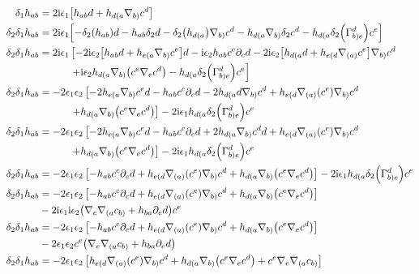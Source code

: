 \begin{align*}
    \delta_1h_{ab}&=2\im\epsilon_1\qty[h_{ab}d+h_{d(a}\nabla_{b)}c^d]\\
    \delta_2\delta_1h_{ab}&=2\im\epsilon_1\qty[-\delta_2\qty(h_{ab})d-h_{ab}\delta_2d-\delta_2\qty(h_{d(a})\nabla_{b)}c^d-h_{d(a}\nabla_{b)}\delta_2 c^d-h_{d(a}\delta_2\qty(\Gamma^d_{b)e})c^e]\\
    \delta_2\delta_1h_{ab}&=2\im\epsilon_1\left[-2\im\epsilon_2\qty[h_{ab}d+h_{e(a}\nabla_{b)}c^e]d-\im\epsilon_2h_{ab}c^c\partial_cd-2\im\epsilon_2\qty[h_{d(a}d+h_{e(d}\nabla_{(a)}c^e]\nabla_{b)}c^d\right.\\
    &\quad\quad\quad\left.+\im\epsilon_2h_{d(a}\nabla_{b)}\qty(c^e\nabla_ec^d)-h_{d(a}\delta_2\qty(\Gamma^d_{b)e})c^e\right]\\
    \delta_2\delta_1h_{ab}&=-2\epsilon_1\epsilon_2\left[-2h_{e(a}\nabla_{b)}c^ed-h_{ab}c^c\partial_cd-2h_{d(a}d\nabla_{b)}c^d+h_{e(d}\nabla_{(a)}\qty(c^e)\nabla_{b)}c^d\right.\\
    &\quad\quad\quad\left.+h_{d(a}\nabla_{b)}\qty(c^e\nabla_ec^d)\right]-2\im\epsilon_1h_{d(a}\delta_2\qty(\Gamma^d_{b)e})c^e\\
    \delta_2\delta_1h_{ab}&=-2\epsilon_1\epsilon_2\left[-2h_{e(a}\nabla_{b)}c^ed-h_{ab}c^c\partial_cd+2h_{d(a}\nabla_{b)}c^dd+h_{e(d}\nabla_{(a)}\qty(c^e)\nabla_{b)}c^d\right.\\
    &\quad\quad\quad\left.+h_{d(a}\nabla_{b)}\qty(c^e\nabla_ec^d)\right]-2\im\epsilon_1h_{d(a}\delta_2\qty(\Gamma^d_{b)e})c^e\\
    \delta_2\delta_1h_{ab}&=-2\epsilon_1\epsilon_2\left[-h_{ab}c^c\partial_cd+h_{e(d}\nabla_{(a)}\qty(c^e)\nabla_{b)}c^d+h_{d(a}\nabla_{b)}\qty(c^e\nabla_ec^d)\right]-2\im\epsilon_1h_{d(a}\delta_2\qty(\Gamma^d_{b)e})c^e\\
    \delta_2\delta_1h_{ab}&=-2\epsilon_1\epsilon_2\left[-h_{ab}c^c\partial_cd+h_{e(d}\nabla_{(a)}\qty(c^e)\nabla_{b)}c^d+h_{d(a}\nabla_{b)}\qty(c^e\nabla_ec^d)\right]\\
    \quad\quad\quad&-2\im\epsilon_1\im\epsilon_2\qty(\nabla_e\nabla_{(a}c_{b)}+h_{ba}\partial_ed)c^e\\
    \delta_2\delta_1h_{ab}&=-2\epsilon_1\epsilon_2\left[-h_{ab}c^c\partial_cd+h_{e(d}\nabla_{(a)}\qty(c^e)\nabla_{b)}c^d+h_{d(a}\nabla_{b)}\qty(c^e\nabla_ec^d)\right]\\
    \quad\quad\quad&-2\epsilon_1\epsilon_2c^e\qty(\nabla_e\nabla_{(a}c_{b)}+h_{ba}\partial_ed)\\
    \delta_2\delta_1h_{ab}&=-2\epsilon_1\epsilon_2\left[h_{e(d}\nabla_{(a)}\qty(c^e)\nabla_{b)}c^d+h_{d(a}\nabla_{b)}\qty(c^e\nabla_ec^d)+c^e\nabla_e\nabla_{(a}c_{b)}\right]\\

\end{align*}
